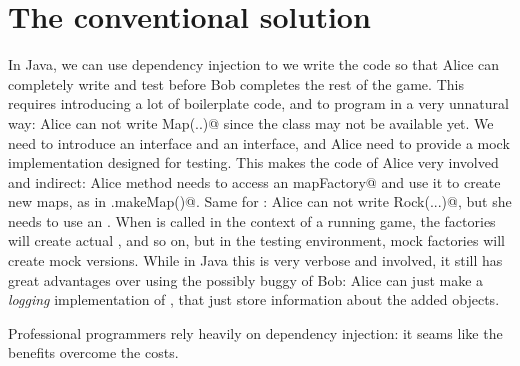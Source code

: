 \documentclass[submission,copyright,creativecommons]{eptcs}
\begin{document}
\section{The conventional solution}
In Java, we can use dependency injection to we write the code so that Alice can 
completely write and test \Q@load@ before
Bob completes the rest of the game.
This requires introducing a lot of boilerplate code, and 
to program in a very unnatural way:
Alice can not write \Q@new Map(..)@
since the \Q@Map@ class may not be available yet.
We need to introduce an \Q@IMap@ interface and an \Q@IMapFactory@ interface,
and Alice need to provide
a mock implementation designed for testing.
This makes the code of Alice very involved and indirect:
Alice \Q@load@ method needs to access an \Q@IMapFactory mapFactory@
and use it to create new maps, as in \Q@mapFactory.makeMap()@.
Same for \Q@Item@s: Alice can not write \Q@new Rock(...)@,
but she needs to use an \Q@IItemFactory@.
When \Q@load@ is called in the context of a running game,
the factories will create actual \Q@Map@s, \Q@Rock@s
and so on, but in the testing environment, 
mock factories will create mock versions.
While in Java this is very verbose and involved,
it still has great advantages over using the
possibly buggy \Q@Map@ of Bob: Alice can just make a \emph{logging}
implementation of \Q@Map@, that just store information about the added objects.

Professional programmers rely heavily on dependency
injection: it seams like the benefits overcome the costs.
\end{document}
